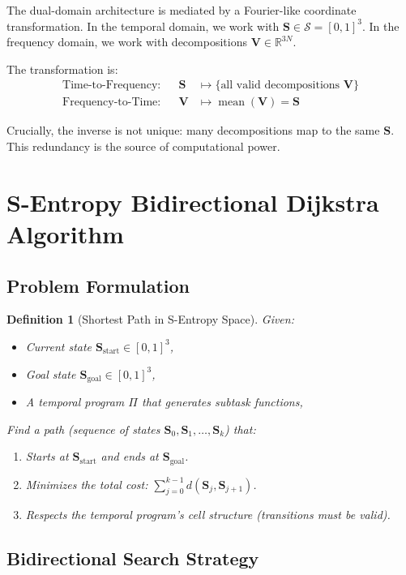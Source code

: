 \documentclass[twocolumn,11pt,a4paper]{article}
\newtheorem{definition}[theorem]{Definition}
\newcommand{\Stuple}{\mathbf{S}}
\DeclareMathOperator{\mean}{mean}
\begin{document}
The dual-domain architecture is mediated by a Fourier-like coordinate transformation. In the temporal domain, we work with $\Stuple \in \mathcal{S} = [0,1]^3$. In the frequency domain, we work with decompositions $\mathbf{V} \in \mathbb{R}^{3N}$.

The transformation is:
\begin{align}
\text{Time-to-Frequency}: && \Stuple &\mapsto \{\text{all valid decompositions } \mathbf{V}\}\\
\text{Frequency-to-Time}: && \mathbf{V} &\mapsto \mean(\mathbf{V}) = \Stuple
\end{align}

Crucially, the inverse is not unique: many decompositions map to the same $\Stuple$. This redundancy is the source of computational power.

\section{S-Entropy Bidirectional Dijkstra Algorithm}
\label{sec:algorithm}

\subsection{Problem Formulation}

\begin{definition}[Shortest Path in S-Entropy Space]
Given:
\begin{itemize}[nosep,leftmargin=1em]
  \item Current state $\Stuple_{\text{start}} \in [0,1]^3$,
  \item Goal state $\Stuple_{\text{goal}} \in [0,1]^3$,
  \item A temporal program $\Pi$ that generates subtask functions,
\end{itemize}
Find a \emph{path} (sequence of states $\Stuple_0, \Stuple_1, \ldots, \Stuple_k$) that:
\begin{enumerate}[nosep,label=(\roman*)]
  \item Starts at $\Stuple_{\text{start}}$ and ends at $\Stuple_{\text{goal}}$.
  \item Minimizes the total cost: $\sum_{j=0}^{k-1} d(\Stuple_j, \Stuple_{j+1})$.
  \item Respects the temporal program's cell structure (transitions must be valid).
\end{enumerate}
\end{definition}

\subsection{Bidirectional Search Strategy}
\end{document}
